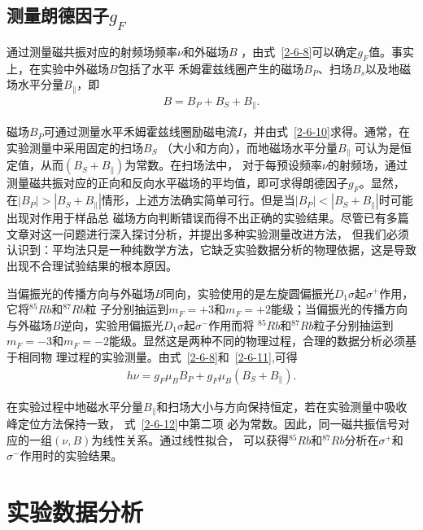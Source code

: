 \documentclass[11pt,a4paper]{article}
\begin{document}
\begin{spacing}{1.3}
\begin{CJK*}{UTF8}{gbsn}
\subsection{测量朗德因子$g_F$}
通过测量磁共振对应的射频场频率$\nu$和外磁场$B$ ，由式~\eqref{2-6-8}可以确定$g_F$值。事实上，在实验中外磁场$B$包括了水平
禾姆霍兹线圈产生的磁场$B_P$、扫场$B_s$以及地磁场水平分量$B_{\parallel}$，即
\begin{eqnarray} \label{2-6-11}
B=B_P+B_S+B_{\parallel}.
\end{eqnarray}
\par
磁场$B_P$可通过测量水平禾姆霍兹线圈励磁电流$I$，并由式~\eqref{2-6-10}求得。通常，在实验测量中采用固定的扫场$B_S$
（大小和方向），而地磁场水平分量$B_{\parallel}$ 可认为是恒定值，从而$(B_S+B_{\parallel})$为常数。在扫场法中，
对于每预设频率$\nu$的射频场，通过测量磁共振对应的正向和反向水平磁场的平均值，即可求得朗德因子$g_F$。显然，
在$|B_P|>|B_S+B_{\parallel}|$情形，上述方法确实简单可行。但是当$|B_P|<|B_S+B_{\parallel}|$时可能出现对作用于样品总
磁场方向判断错误而得不出正确的实验结果。尽管已有多篇文章对这一问题进行深入探讨分析，并提出多种实验测量改进方法，
但我们必须认识到：平均法只是一种纯数学方法，它缺乏实验数据分析的物理依据，这是导致出现不合理试验结果的根本原因。\par
当偏振光的传播方向与外磁场$B$同向，实验使用的是左旋圆偏振光$D_1\sigma$起$\sigma^+$作用，它将$^{85}Rb$和$^{87}Rb$粒
子分别抽运到$m_F=+3$和$m_F=+2$能级；当偏振光的传播方向与外磁场$B$逆向，实验用偏振光$D_1\sigma$起$\sigma^-$作用而将
$^{85}Rb$和$^{87}Rb$粒子分别抽运到$m_F=-3$和$m_F=-2$能级。显然这是两种不同的物理过程，合理的数据分析必须基于相同物
理过程的实验测量。由式~\eqref{2-6-8}和~\eqref{2-6-11},可得
\begin{eqnarray} \label{2-6-12}
h\nu=g_F\mu_BB_P+g_F\mu_B(B_S+B_{\parallel}).
\end{eqnarray}
\par
在实验过程中地磁水平分量$B_{\parallel}$和扫场大小与方向保持恒定，若在实验测量中吸收峰定位方法保持一致，
式~\eqref{2-6-12}中第二项 必为常数。因此，同一磁共振信号对应的一组$(\nu,B)$为线性关系。通过线性拟合，
可以获得$^{85}Rb$和$^{87}Rb$分析在$\sigma^+$和$\sigma^-$作用时的实验结果。

\section{实验数据分析}

\end{CJK*}
\end{spacing}
\end{document}
